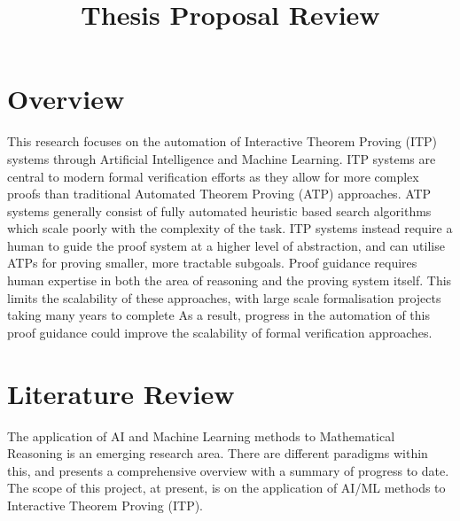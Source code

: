 \documentclass{article}
\title{Thesis Proposal Review}
\begin{document}
    \maketitle


    \section{Overview}\label{sec:overview}
    This research focuses on the automation of Interactive Theorem Proving (ITP) systems through Artificial Intelligence and Machine Learning.
    ITP systems are central to modern formal verification efforts as they allow for more complex proofs than traditional Automated Theorem Proving (ATP) approaches\cite{nawaz_survey_2019, harrison_history_2014}.
    ATP systems generally consist of fully automated heuristic based search algorithms which scale poorly with the complexity of the task.
    ITP systems instead require a human to guide the proof system at a higher level of abstraction, and can utilise ATPs for proving smaller, more tractable subgoals.
    Proof guidance requires human expertise in both the area of reasoning and the proving system itself.
    This limits the scalability of these approaches, with large scale formalisation projects taking many years to complete\cite{wiedijk_bruijn_2000}
    As a result, progress in the automation of this proof guidance could improve the scalability of formal verification approaches.  \\




    \section{Literature Review}\label{sec:literature-review}
    The application of AI and Machine Learning methods to Mathematical Reasoning is an emerging research area.
    There are different paradigms within this, and\cite{lu_survey_nodate} presents a comprehensive overview with a summary of progress to date.
    The scope of this project, at present, is on the application of AI/ML methods to Interactive Theorem Proving (ITP). \\
\end{document}
